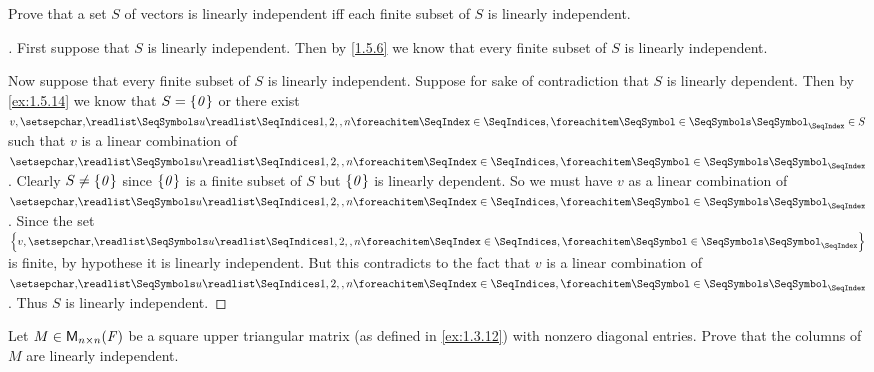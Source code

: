 \begin{ex}\label{ex:1.5.16}
  Prove that a set \(S\) of vectors is linearly independent iff each finite subset of \(S\) is linearly independent.
\end{ex}

\begin{proof}[]
  First suppose that \(S\) is linearly independent.
  Then by \cref{1.5.6} we know that every finite subset of \(S\) is linearly independent.

  Now suppose that every finite subset of \(S\) is linearly independent.
  Suppose for sake of contradiction that \(S\) is linearly dependent.
  Then by \cref{ex:1.5.14} we know that \(S = \left\lbrace\mathit{0}\right\rbrace\) or there exist \(v, \seq{u}{1,2,,n} \in S\) such that \(v\) is a linear combination of \(\seq{u}{1,2,,n}\).
  Clearly \(S \neq \left\lbrace\mathit{0}\right\rbrace\) since \(\left\lbrace\mathit{0}\right\rbrace\) is a finite subset of \(S\) but \(\left\lbrace\mathit{0}\right\rbrace\) is linearly dependent.
  So we must have \(v\) as a linear combination of \(\seq{u}{1,2,,n}\).
  Since the set \(\set{v,\seq{u}{1,2,,n}}\) is finite, by hypothese it is linearly independent.
  But this contradicts to the fact that \(v\) is a linear combination of \(\seq{u}{1,2,,n}\).
  Thus \(S\) is linearly independent.
\end{proof}

\begin{ex}\label{ex:1.5.17}
  Let \(M \in \mathsf{M}_{{n} \times n}({\mathit{F}})\) be a square upper triangular matrix (as defined in \cref{ex:1.3.12}) with nonzero diagonal entries.
  Prove that the columns of \(M\) are linearly independent.
\end{ex}

